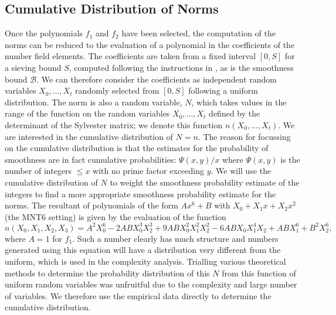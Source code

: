 \documentclass[a4paper, 10pt, envcountsect, runningheads]{lms}
\numberwithin{figure}{section}
\numberwithin{equation}{section}
\begin{document}
\subsection{Cumulative Distribution of Norms}
\label{ss:norms_dist}
Once the polynomials $f_1$ and $f_2$ have been selected, the computation of the norms can be reduced to the evaluation of a polynomial in the coefficients of the number field elements. The coefficients are taken from a fixed interval $[0,S]$ for a sieving bound $S$, computed following the instructions in \cite{joux-lercier-smart-vercauteren06}, as is the smoothness bound $\mathcal{B}$. We can therefore consider the coefficients as independent random variables $X_0,\ldots,X_t$ randomly selected from $[0,S]$ following a uniform distribution. The norm is also a random variable, $N$, which takes values in the range of the function on the random variables $X_0,\ldots,X_t$ defined by the determinant of the Sylvester matrix; we denote this function $n(X_0,\ldots,X_t)$. We are interested in the cumulative distribution of $N=n$. 
The reason for focussing on the cumulative distribution is that the estimates for the probability of smoothness are in fact cumulative probabilities: $\Psi(x,y)/x$ where $\Psi(x,y)$ is the number of integers $\leq x$ with no prime factor exceeding $y$. We will use the cumulative distribution of $N$ to weight the smoothness probability estimate of the integers to find a more appropriate smoothness probability estimate for the norms.
The resultant of polynomials of the form $Ax^6+B$ with $X_0+X_1 x +X_2 x^2$ (the MNT6 setting) is given by the evaluation of the function {\small{$$n(X_0,X_1,X_2,X_3)=A^2 X_0^6 - 2 A B X_0^3 X_2^3 + 9 A B X_0^2 X_1^2 X_2^2 - 6 A B X_0 X_1^4 X_2 + ABX_1^6 + B^2 X_2^6,$$}} where $A=1$ for $f_1$. Such a number clearly has much structure and numbers generated using this equation will have a distribution very different from the uniform, which is used in the complexity analysis. Trialling various theoretical methods to determine the probability distribution of this $N$ from this function of uniform random variables was unfruitful due to the complexity and large number of variables. We therefore use the empirical data directly to determine the cumulative distribution. 
\end{document}
